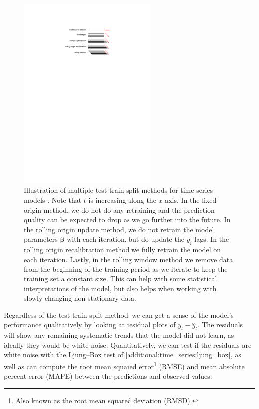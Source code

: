 \begin{figure}
\centering
\includegraphics[width=0.6\textwidth]{figures/stats/rolling_forecast_origin}
\caption{
Illustration of multiple test train split methods for time series models \cite{bergmeir_dissertation}.
Note that $t$ is increasing along the $x$-axis.
In the fixed origin method, we do not do any retraining and the prediction quality
can be expected to drop as we go further into the future.
In the rolling origin update method, we do not retrain the model parameters $\bm{\beta}$
with each iteration, but do update the $y_{i}$ lags.
In the rolling origin recalibration method we fully retrain the model on each iteration.
Lastly, in the rolling window method we remove data from the beginning of the training period
as we iterate to keep the training set a constant size.
This can help with some statistical interpretations of the model,
but also helps when working with slowly changing non-stationary data.
}
\label{fig:rolling_forecast_origin}
\end{figure}

Regardless of the test train split method, we can get a sense of the model's performance
qualitatively by looking at residual plots of $y_{t} - \hat{y}_{t}$.
The residuals will show any remaining systematic trends that the model did not learn,
as ideally they would be white noise.
Quantitatively, we can test
if the residuals are white noise with the Ljung--Box test of \cref{additional:time_series:ljung_box},
as well as can compute the
root mean squared error\footnote{Also known as the root mean squared deviation (RMSD).} (RMSE)
and mean absolute percent error (MAPE)
between the predictions and observed values:

